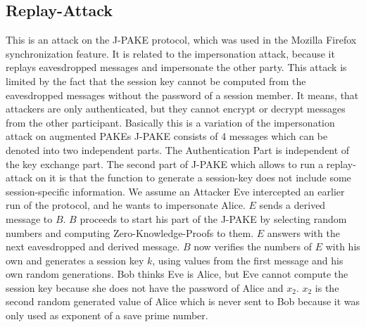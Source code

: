 \documentclass[journal]{IEEEtran}
\begin{document}
\subsection{Replay-Attack}
This is an attack on the J-PAKE protocol, which was used in the Mozilla Firefox synchronization feature. It is related to the impersonation attack, because it replays eavesdropped messages and impersonate the other party.
This attack is limited by the fact that the session key cannot be computed from the eavesdropped messages without the password of a session member.
It means, that attackers are only authenticated, but they cannot encrypt or decrypt messages from the other participant.
Basically this is a variation of the impersonation attack on augmented PAKEs 
J-PAKE consists of 4 messages which can be denoted into two independent parts. The Authentication Part is independent of the key exchange part. \cite{hao2008password} 
The second part of J-PAKE which allows to run a replay-attack on it is that the function to generate a session-key does not include some session-specific information. \cite{toorani2014security}
We assume an Attacker Eve intercepted an earlier run of the protocol, and he wants to impersonate Alice.
$E$ sends a derived message to $B$. 
$B$ proceeds to start his part of the J-PAKE by selecting random numbers and computing Zero-Knowledge-Proofs to them.
$E$ answers with the next eavesdropped and derived message. 
$B$ now verifies the numbers of $E$ with his own and generates a session key $k$, using values from the first message and his own random generations.
Bob thinks Eve is Alice, but Eve cannot compute the session key because she does not have the password of Alice and $x_2$.
$x_2$ is the second random generated value of Alice which is never sent to Bob because it was only used as exponent of a save prime number. 
\cite{toorani2014security} 
\end{document}
